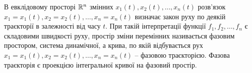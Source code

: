В евклідовому просторі $\mathbb{R}^n$ змінних $x_1(t), x_2(t), \ldots, x_n(t)$ розв’язок $x_1 = x_1(t), x_2 = x_2(t), \ldots, x_n = x_n(t)$ визначає закон руху по деякій траєкторії в залежності від часу $t$. При такій інтерпретації функції $f_1, f_2, \ldots, f_n$ є складовими швидкості руху, простір зміни перемінних називається фазовим простором, система динамічної, а крива, по якій відбувається рух $x_1 = x_1(t), x_2 = x_2(t), \ldots, x_n = x_n(t)$ -- фазовою траєкторією. Фазова траєкторія є проекцією інтегральної кривої на фазовий простір.
